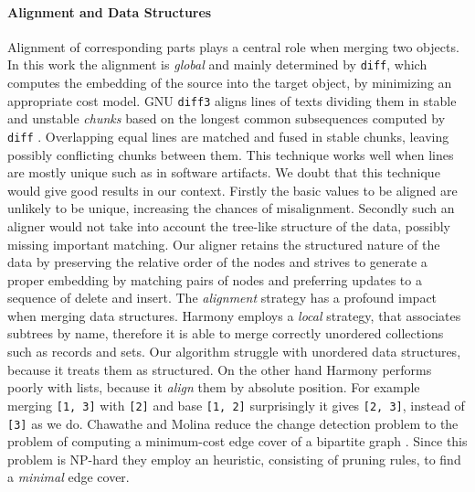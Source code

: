 \documentclass{sigplanconf}
\theoremstyle{plain}
\begin{document}
\paragraph{Alignment and Data Structures} 
Alignment of corresponding parts plays a central role when merging
two objects. 
%
In this work the alignment is \emph{global} and mainly determined by
\texttt{diff},
which computes the embedding of the source into the target object, by
minimizing an appropriate cost model.
%
GNU \texttt{diff3} aligns lines of texts dividing them in stable and
unstable \emph{chunks} based on the longest common subsequences
computed by \texttt{diff} \cite{PierceDiff3}.  
%
Overlapping equal lines are matched and fused in stable chunks,
leaving possibly conflicting chunks between them.
%
This technique works well when lines are mostly unique such as in
software artifacts.
%
We doubt that this technique would give good results in our context.
%
Firstly the basic values to be aligned are unlikely to be unique,
increasing the chances of misalignment.
%
Secondly such an aligner would not take into account the tree-like
structure of the data, possibly missing important matching.
%
Our aligner retains the structured nature of the data by preserving
the relative order of the nodes and strives to generate a proper
embedding by matching pairs of nodes and preferring updates
to a sequence of delete and insert.
%
The \emph{alignment} strategy has a profound impact when merging data
structures.
%
Harmony employs a \emph{local} strategy, that associates subtrees by
name, therefore it is able to merge correctly unordered collections
such as records and sets.
%
Our algorithm struggle with unordered data structures, 
because it treats them as structured.
%
On the other hand Harmony performs poorly with lists, because
it \emph{align} them by absolute position.
%
For example merging \texttt{[1, 3]} with \texttt{[2]} and base 
\texttt{[1, 2]} surprisingly it gives \texttt{[2, 3]}, instead of
\texttt{[3]} as we do.
%
Chawathe and Molina reduce the change detection problem to the problem
of computing a minimum-cost edge cover of a bipartite graph
\cite{Chawathe96}.
%
Since this problem is NP-hard they employ an heuristic, consisting of
pruning rules, to find a \emph{minimal} edge cover.
			
\end{document}
